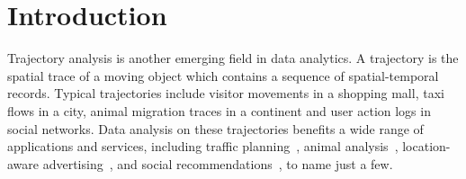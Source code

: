 \section{Introduction}
Trajectory analysis is another emerging field in data analytics. A trajectory is the spatial trace
of a moving object which contains a sequence of spatial-temporal records. Typical trajectories
include visitor movements in a shopping mall, taxi flows in a city, animal migration traces in a continent and user action logs in social networks.
Data analysis on these trajectories benefits a wide range of applications and services, including traffic planning~\cite{zheng2011urban}, animal analysis~\cite{li2010miningperiodic}, location-aware advertising~\cite{guo2016influence}, and social recommendations~\cite{bao2013survey}, to name just a few. 

